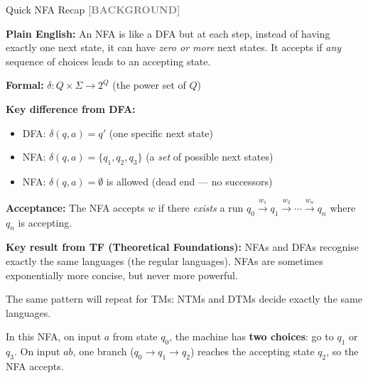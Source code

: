 \documentclass[11pt,a4paper]{article}
\newcommand{\kbg}{\textcolor{gray}{\textbf{[BACKGROUND]}}}
\begin{document}
\begin{definitionbox}{Quick NFA Recap \kbg}

\textbf{Plain English:} An NFA is like a DFA but at each step, instead of having exactly one next state, it can have \textit{zero or more} next states. It accepts if \textit{any} sequence of choices leads to an accepting state.

\textbf{Formal:} $\delta: Q \times \Sigma \to 2^Q$ (the power set of $Q$)

\textbf{Key difference from DFA:}
\begin{itemize}[nosep]
\item DFA: $\delta(q, a) = q'$ (one specific next state)
\item NFA: $\delta(q, a) = \{q_1, q_2, q_3\}$ (a \textit{set} of possible next states)
\item NFA: $\delta(q, a) = \emptyset$ is allowed (dead end --- no successors)
\end{itemize}

\textbf{Acceptance:} The NFA accepts $w$ if there \textit{exists} a run $q_0 \xrightarrow{w_1} q_1 \xrightarrow{w_2} \cdots \xrightarrow{w_n} q_n$ where $q_n$ is accepting.

\textbf{Key result from TF (Theoretical Foundations):} NFAs and DFAs recognise exactly the same languages (the regular languages). NFAs are sometimes exponentially more concise, but never more powerful.

The same pattern will repeat for TMs: NTMs and DTMs decide exactly the same languages.
\end{definitionbox}

\begin{center}
\end{center}

In this NFA, on input $a$ from state $q_0$, the machine has \textbf{two choices}: go to $q_1$ or $q_3$. On input $ab$, one branch ($q_0 \to q_1 \to q_2$) reaches the accepting state $q_2$, so the NFA accepts.
\end{document}
